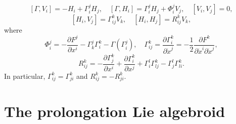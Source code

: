 \documentclass[11pt]{article}
\theoremstyle{plain}
\newtheorem{proposition}{Proposition}
\theoremstyle{definition}
\begin{document}
\begin{equation} \label{prop:bracketsstandard1}
    [\Gamma,V_i]=-H_i+\Gamma_i^j H_j,\quad [\Gamma,H_i]=\Gamma_i^j H_j+\Phi_i^j V_j,\quad [V_i,V_j]=0,
\end{equation}
\begin{equation}\label{prop:bracketsstandard2}
    [H_i,V_j]=\Gamma_{ij}^k V_k,\quad [H_i,H_j]=R_{ij}^k V_k,
\end{equation}
where
\begin{equation*}
    \Phi_i^j=-\frac{\partial F^j}{\partial x^i}-\Gamma_k^j \Gamma_i^k-\Gamma(\Gamma_i^j),\quad \Gamma_{ij}^k=\frac{\partial \Gamma_i^k}{\partial \dot{x}^j}=-\frac{1}{2}\frac{\partial F^k}{\partial \dot{x}^i \partial \dot{x}^j},
\end{equation*}
\begin{equation*}
    R_{ij}^k=-\frac{\partial \Gamma_j^k}{\partial x^i}+\frac{\partial \Gamma_i^k}{\partial x^j}+\Gamma_i^l\Gamma_{lj}^k-\Gamma_j^l \Gamma_{li}^k.
\end{equation*}
In particular, $\Gamma_{ij}^k=\Gamma_{ji}^k$ and $R_{ij}^k=-R_{ji}^k$.



\section{The prolongation Lie algebroid}\label{sec:pullback}
\end{document}
